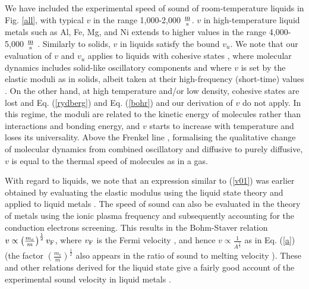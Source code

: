 \documentclass[aps,prl,groupedaddress,fleqn,twocolumn,10pt]{revtex4-1}
\begin{document}
We have included the experimental speed of sound of room-temperature liquids in Fig. \ref{all}, with typical $v$ in the range 1,000-2,000 $\frac{\rm m}{\rm s}$. $v$ in high-temperature liquid metals such as Al, Fe, Mg, and Ni extends to higher values in the range 4,000-5,000 $\frac{\rm m}{\rm s}$ \cite{metals}. Similarly to solids, $v$ in liquids satisfy the bound $v_u$. We note that our evaluation of $v$ and $v_u$ applies to liquids with cohesive states \cite{f2}, where molecular dynamics includes solid-like oscillatory components \cite{frenkel} and where $v$ is set by the elastic moduli as in solids, albeit taken at their high-frequency (short-time) values \cite{frenkel,boon}. On the other hand, at high temperature and/or low density, cohesive states are lost and Eq. (\ref{rydberg}) and Eq. (\ref{bohr}) and our derivation of $v$ do not apply. In this regime, the moduli are related to the kinetic energy of molecules rather than interactions and bonding energy, and $v$ starts to increase with temperature and loses its universality. Above the Frenkel line \cite{f1,f2,f3}, formalising the qualitative change of molecular dynamics from combined oscillatory and diffusive to purely diffusive, $v$ is equal to the thermal speed of molecules as in a gas.

With regard to liquids, we note that an expression similar to (\ref{v01}) was earlier obtained by evaluating the elastic modulus using the liquid state theory and applied to liquid metals \cite{gitis}. The speed of sound can also be evaluated in the theory of metals using the ionic plasma frequency and subsequently accounting for the conduction electrons screening. This results in the Bohm-Staver relation $v\propto\left(\frac{m_e}{m}\right)^{\frac{1}{2}}v_{\rm F}$, where $v_{\rm F}$ is the Fermi velocity \cite{ashcroft}, and hence $v\propto\frac{1}{A^\frac{1}{2}}$ as in Eq. (\ref{a}) (the factor $\left(\frac{m_e}{m}\right)^{\frac{1}{2}}$ also appears in the ratio of sound to melting velocity \cite{hartnoll1}). These and other relations derived for the liquid state give a fairly good account of the experimental sound velocity in liquid metals \cite{gitis,metals}.
\end{document}

